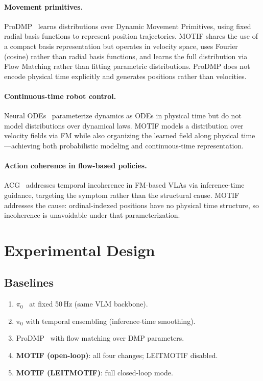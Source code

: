 \documentclass[11pt]{article}
\theoremstyle{plain}
\theoremstyle{definition}
\begin{document}
\paragraph{Movement primitives.}
ProDMP~\cite{li2023prodmp} learns distributions over Dynamic Movement
Primitives, using fixed radial basis functions to represent position
trajectories.
MOTIF shares the use of a compact basis representation but operates in
velocity space, uses Fourier (cosine) rather than radial basis functions,
and learns the full distribution via Flow Matching rather than fitting
parametric distributions.
ProDMP does not encode physical time explicitly and generates positions
rather than velocities.

\paragraph{Continuous-time robot control.}
Neural ODEs~\cite{chen2018neural} parameterize dynamics as ODEs in physical
time but do not model distributions over dynamical laws.
MOTIF models a distribution over velocity fields via FM while also
organizing the learned field along physical time---achieving both
probabilistic modeling and continuous-time representation.

\paragraph{Action coherence in flow-based policies.}
ACG~\cite{acg2025} addresses temporal incoherence in FM-based VLAs via
inference-time guidance, targeting the symptom rather than the structural
cause.
MOTIF addresses the cause: ordinal-indexed positions have no physical
time structure, so incoherence is unavoidable under that parameterization.

\section{Experimental Design}
\label{sec:exp}

\subsection{Baselines}

\begin{enumerate}[leftmargin=2em,label=(\roman*)]
  \item $\pi_0$~\cite{black2024pi0} at fixed 50\,Hz (same VLM backbone).
  \item $\pi_0$ with temporal ensembling (inference-time smoothing).
  \item ProDMP~\cite{li2023prodmp} with flow matching over DMP parameters.
  \item \textbf{MOTIF (open-loop)}: all four changes; LEITMOTIF disabled.
  \item \textbf{MOTIF (LEITMOTIF)}: full closed-loop mode.
\end{enumerate}
\end{document}
